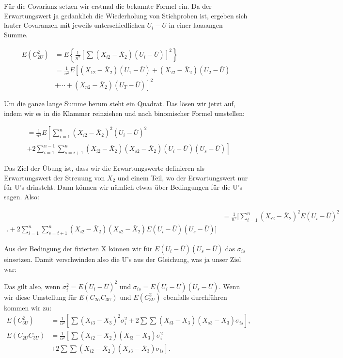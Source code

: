 \documentclass[
  10pt,
  letterpaper,
  a4paper, twoside]{scrreprt}
\begin{document}
\begin{tcolorbox}
Für die Covarianz setzen wir erstmal die bekannte Formel ein. Da der
Erwartungswert ja gedanklich die Wiederholung von Stichproben ist,
ergeben sich lauter Covaranzen mit jeweils unterschiedlichen
\(U_i-\bar{U}\) in einer laaaangen Summe.

\begin{align}
E\left(C_{2 U}^2\right) &=E\left\{\frac{1}{n^2}\left[\sum\left(X_{i 2}-\bar{X}_2\right)\left(U_i-\bar{U}\right)\right]^2\right\} \\
&=\frac{1}{n^2} E {\left[\left(X_{12}-\bar{X}_2\right)\left(U_1-\bar{U}\right)+\left(X_{22}-\bar{X}_2\right)\left(U_2-\bar{U}\right)\right.} \\
&\left.+\cdots+\left(X_{n 2}-\bar{X}_2\right)\left(U_T-\bar{U}\right)\right]^2
\end{align}

Um die ganze lange Summe herum steht ein Quadrat. Das lösen wir jetzt
auf, indem wir es in die Klammer reinziehen und nach binomischer Formel
umstellen:

\begin{align}
&=\frac{1}{n^2} E\left[\sum_{i=1}^n\left(X_{i 2}-\bar{X}_2\right)^2\left(U_i-\bar{U}\right)^2\right. \\
&\left.+2 \sum_{i=1}^{n-1} \sum_{s=i+1}^n\left(X_{i 2}-\bar{X}_2\right)\left(X_{s 2}-\bar{X}_2\right)\left(U_i-\bar{U}\right)\left(U_s-\bar{U}\right)\right]
\end{align}

Das Ziel der Übung ist, dass wir die Erwartungswerte definieren als
Erwartungswert der Streuung von \(X_2\) und einem Teil, wo der
Erwartungswert nur für U's drinsteht. Dann können wir nämlich etwas über
Bedingungen für die U's sagen. Also:

\begin{align}
&=\frac{1}{n^2}[\sum_{i=1}^n(X_{i 2}-\bar{X}_2)^2 E(U_i-\bar{U})^2 \\
.+2 \sum_{i=1}^n \sum_{s=t+1}^n(X_{i 2}-\bar{X}_2)(X_{s 2}-\bar{X}_2) E(U_i-\bar{U})(U_s-\bar{U})] 
\end{align}

Aus der Bedingung der fixierten X können wir für
\(E(U_i-\bar{U})(U_s-\bar{U})\) das \(\sigma_{is}\) einsetzen. Damit
verschwinden also die U's aus der Gleichung, was ja unser Ziel war:

Das gilt also, wenn \(\sigma_i^2=E\left(U_i-\bar{U}\right)^2\) und
\(\sigma_{i s}=E\left(U_i-\bar{U}\right)\left(U_s-\bar{U}\right)\). Wenn
wir diese Umstellung für \(E\left(C_{2 U} C_{3 U}\right)\) und
\(E\left(C_{3 U}^2\right)\) ebenfalls durchführen kommen wir zu:
\begin{align}
 E\left(C_{3 U}^2\right)&=\frac{1}{n^2}\left[\sum\left(X_{i 3}-\bar{X}_3\right)^2 \sigma_i^2+2 \sum \sum\left(X_{i 3}-\bar{X}_3\right)\left(X_{s 3}-\bar{X}_3\right) \sigma_{i s}\right], \\
E\left(C_{2 U} C_{3 U}\right)&=\frac{1}{n^2}\left[\sum\left(X_{i 2}-\bar{X}_2\right)\left(X_{i 3}-\bar{X}_3\right) \sigma_i^2\right. \\
&\left.+2 \sum \sum\left(X_{i 2}-\bar{X}_2\right)\left(X_{s 3}-\bar{X}_3\right) \sigma_{i s}\right] \text {. } \\
&
\end{align}


\end{tcolorbox}
\end{document}
